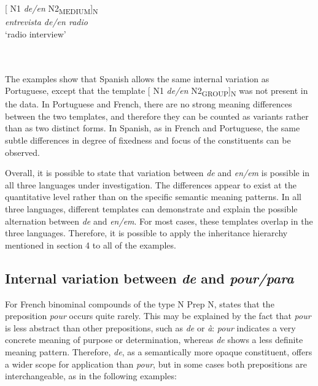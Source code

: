 \documentclass[output=paper]{langsci/langscibook}
\begin{document}
\begin{minipage}{0.4\textwidth}
[ N1 \textit{de/en} N2\textsubscript{MEDIUM}]\textsubscript{N}\\
\textit{entrevista de/en radio}\\
`radio interview'
\end{minipage} \\
\hfill
\\

The examples show that Spanish allows the same internal variation as Portuguese, except that the template [ N1 \textit{de/en} N2\textsubscript{GROUP}]\textsubscript{N} was not present in the data. In Portuguese and French, there are no strong meaning differences between the two templates, and therefore they can be counted as variants rather than as two distinct forms. In Spanish, as in French and Portuguese, the same subtle differences in degree of fixedness and focus of the constituents can be observed. 

Overall, it is possible to state that variation between \textit{de} and \textit{en/em} is possible in all three languages under investigation. The differences appear to exist at the quantitative level rather than on the specific semantic meaning patterns. In all three languages, different templates can demonstrate and explain the possible alternation between \textit{de} and \textit{en/em}. For most cases, these templates overlap in the three languages. Therefore, it is possible to apply the inheritance hierarchy mentioned in section 4 to all of the examples.

 \subsection{Internal variation between \textit{de} and \textit{pour/para}}
 
 For French binominal compounds of the type N Prep N, \citet{Laumann:1998} states that the preposition \textit{pour} occurs quite rarely. This may be explained by the fact that \textit{pour} is less abstract than other prepositions, such as \textit{de} or \textit{à}: \textit{pour }indicates a very concrete meaning of purpose or determination, whereas \textit{de} shows a less definite meaning pattern. Therefore, \textit{de}, as a semantically more opaque constituent, offers a wider scope for application than \textit{pour}, but in some cases both prepositions are interchangeable, as in the following examples:
\end{document}
